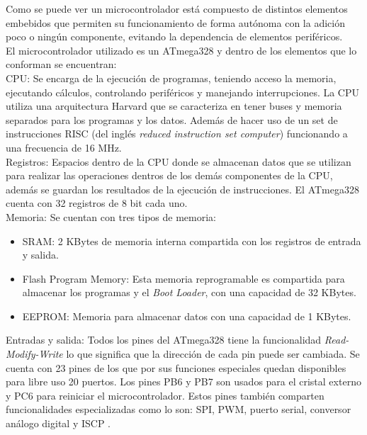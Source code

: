 \documentclass{iccmemoria}
\begin{document}
Como se puede ver un microcontrolador está compuesto de distintos elementos embebidos que permiten su funcionamiento de forma autónoma con la adición poco o ningún componente, evitando la dependencia de elementos periféricos.\\

El microcontrolador utilizado es un ATmega328 y dentro de los elementos que lo conforman se encuentran:\\

CPU: Se encarga de la ejecución de programas, teniendo acceso la memoria, ejecutando cálculos, controlando periféricos y manejando interrupciones. La CPU utiliza una arquitectura Harvard que se caracteriza en tener buses y memoria separados para los programas y los datos. Además de hacer uso de un set de instrucciones RISC (del inglés \emph{reduced instruction set computer}) funcionando a una frecuencia de 16 MHz.\\

Registros: Espacios dentro de la CPU donde se almacenan datos que se utilizan para realizar las operaciones dentros de los demás componentes de la CPU, además se guardan los resultados de la ejecución de instrucciones. El ATmega328 cuenta con 32 registros de 8 bit cada uno.\\

Memoria: Se cuentan con tres tipos de memoria:
\begin{itemize}
    \item SRAM: 2 KBytes de memoria interna compartida con los registros de entrada y salida.
    \item Flash Program Memory: Esta memoria reprogramable es compartida para almacenar los programas y el \emph{Boot
Loader}, con una capacidad de 32 KBytes.
    \item EEPROM: Memoria para almacenar datos con una capacidad de 1 KBytes.
\end{itemize}

Entradas y salida: Todos los pines del ATmega328 tiene la funcionalidad \emph{Read-Modify-Write} lo que significa que la dirección de cada pin puede ser cambiada. Se cuenta con 23 pines de los que por sus funciones especiales quedan disponibles para libre uso 20 puertos. Los pines PB6 y PB7 son usados para el cristal externo y PC6 para reiniciar el microcontrolador. Estos pines también comparten funcionalidades especializadas como lo son: SPI, PWM, puerto serial, conversor análogo digital y ISCP \cite{atemel:atemega328}.\\
\end{document}
